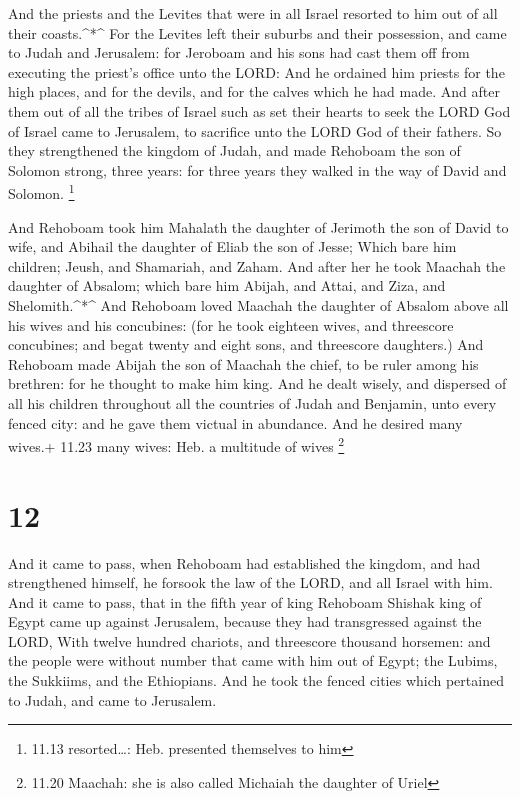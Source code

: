  And the priests and the Levites that were in all Israel
resorted to him out of all their coasts.\^{}*\^{}  For the
Levites left their suburbs and their possession, and came to Judah and
Jerusalem: for Jeroboam and his sons had cast them off from executing
the priest's office unto the LORD:  And he ordained him
priests for the high places, and for the devils, and for the calves
which he had made.  And after them out of all the tribes of
Israel such as set their hearts to seek the LORD God of Israel came to
Jerusalem, to sacrifice unto the LORD God of their fathers.
 So they strengthened the kingdom of Judah, and made
Rehoboam the son of Solomon strong, three years: for three years they
walked in the way of David and Solomon. \footnote{11.13 resorted\ldots:
  Heb. presented themselves to him}

 And Rehoboam took him Mahalath the daughter of Jerimoth
the son of David to wife, and Abihail the daughter of Eliab the son of
Jesse;  Which bare him children; Jeush, and Shamariah, and
Zaham.  And after her he took Maachah the daughter of
Absalom; which bare him Abijah, and Attai, and Ziza, and
Shelomith.\^{}*\^{}  And Rehoboam loved Maachah the
daughter of Absalom above all his wives and his concubines: (for he took
eighteen wives, and threescore concubines; and begat twenty and eight
sons, and threescore daughters.)  And Rehoboam made Abijah
the son of Maachah the chief, to be ruler among his brethren: for he
thought to make him king.  And he dealt wisely, and
dispersed of all his children throughout all the countries of Judah and
Benjamin, unto every fenced city: and he gave them victual in abundance.
And he desired many wives.+ 11.23 many wives: Heb. a multitude of wives
\footnote{11.20 Maachah: she is also called Michaiah the daughter of
  Uriel}

\hypertarget{section-11}{%
\section{12}\label{section-11}}

 And it came to pass, when Rehoboam had established the
kingdom, and had strengthened himself, he forsook the law of the LORD,
and all Israel with him.  And it came to pass, that in the
fifth year of king Rehoboam Shishak king of Egypt came up against
Jerusalem, because they had transgressed against the LORD, 
With twelve hundred chariots, and threescore thousand horsemen: and the
people were without number that came with him out of Egypt; the Lubims,
the Sukkiims, and the Ethiopians.  And he took the fenced
cities which pertained to Judah, and came to Jerusalem.

